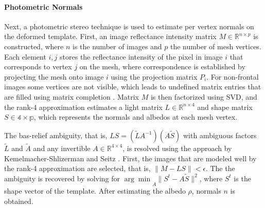 \paragraph*{Photometric Normals} Next, a photometric stereo technique \cite{Kemelmacher-Shlizerman:2011:FRW} is used to estimate per vertex normals on the deformed template. First, an image reflectance intensity matrix $M \in \mathbb{R}^{n \times p}$ is constructed, where $n$ is the number of images and $p$ the number of mesh vertices. Each element $i,j$ stores the reflectance intensity of the pixel in image $i$ that corresponds to vertex $j$ on the mesh, where correspondence is established by projecting the mesh onto image $i$ using the projection matrix $P_i$. For non-frontal images some vertices are not visible, which leads to undefined matrix entries that are filled using matrix completion \cite{Lin09}. Matrix $M$ is then factorized using SVD, and the rank-4 approximation estimates a light matrix $L \in \mathbb{R}^{n \times 4}$ and shape matrix $S \in \mathbb{4 \times p}$, which represents the normals and albedos at each mesh vertex. 

The bas-relief ambiguity, that is, $LS=(\tilde{L}A^{-1})(A\tilde{S})$ with ambiguous factors $\tilde{L}$ and $\tilde{A}$ and any invertible $A \in \mathbb{R}^{4 \times 4}$, is resolved using the approach by Kemelmacher-Shlizerman and Seitz \cite{Kemelmacher-Shlizerman:2011:FRW}. First, the images that are modeled well by the rank-4 approximation are selected, that is, $\|M-LS\|<\epsilon$. The the ambiguity is recovered by solving for $\arg{\min}\underset{A}\,\|S^{t} - A\tilde{S}\|^2 $, where $S^{t}$ is the shape vector of the template. After estimating the albedo $\rho$, normals $n$ is obtained. 



